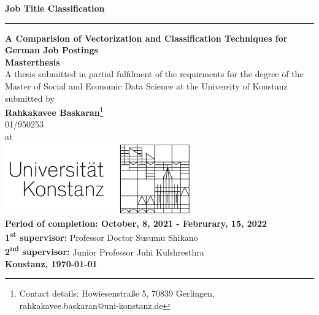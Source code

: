 \documentclass[12pt, a4paper, titlepage]{article}
\begin{document}
\begin{titlepage}
    \begin{center}
    {\LARGE \textbf{Job Title Classification}}
    \noindent\rule[0.5ex]{\linewidth}{1pt}
    {\Large \textbf{A Comparision of Vectorization and Classification Techniques for German Job Postings}}
    \\[1cm]
    {\Large \textbf{Masterthesis}}
    \\[1cm]
    {\normalsize A thesis submitted in partial fulfilment of the requirments for the degree of the Master of Social and Economic Data Science at the University of Konstanz}
    \\[1cm]
    {\Large submitted by}
    \\[0.5cm]
    \renewcommand*{\thefootnote}{\fnsymbol{footnote}}
    {\Large \textbf{Rahkakavee Baskaran}\footnote{Contact details: Howiesenstraße 5, 70839 Gerlingen, rahkakavee.baskaran@uni-konstanz.de}}
    \\[0.5cm]
    {\Large 01/950253}
    \\[0.5cm]
    {\Large at}
    \\[1cm]
    \includegraphics[width=0.6\textwidth]{logo.jpg}
    \\[1cm]
    {\normalsize \textbf{Period of completion: October, 8, 2021 - Februrary, 15, 2022}} 
    \\[0.2cm]
  {\normalsize \textbf{1\textsuperscript{st} supervisor:} Professor Doctor Susumu Shikano}
  \\[0.1cm]
  {\normalsize \textbf{2\textsuperscript{nd} supervisor:} Junior Professor Juhi Kulshresthra}
  \\[1cm]
    {\Large \textbf{Konstanz, \today}}
  \end{center}
    \end{titlepage}

\tableofcontents
\newpage
\listoffigures
\newpage
\listoftables
\newpage
\end{document}
